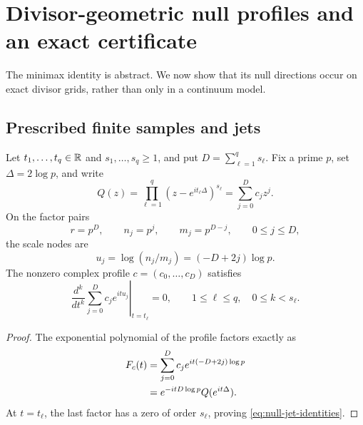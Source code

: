 \section{Divisor-geometric null profiles and an exact certificate}
\label{sec:geometric-certificates}

The minimax identity is abstract.  We now show that its null directions
occur on exact divisor grids, rather than only in a continuum model.

\subsection{Prescribed finite samples and jets}

\begin{theorem}
\label{thm:geometric-null-profile}
Let $t_1,\ldots,t_q\in\mathbb R$ and $s_1,\ldots,s_q\geq1$, and put
\(
 D=\sum_{\ell=1}^q s_\ell
\).
Fix a prime $p$, set $\Delta=2\log p$, and write
\begin{equation}\label{eq:null-polynomial}
 Q(z)=\prod_{\ell=1}^q
 (z-e^{it_\ell\Delta})^{s_\ell}
 =\sum_{j=0}^Dc_jz^j.
\end{equation}
On the factor pairs
\begin{equation}\label{eq:prime-power-factor-pairs}
 r=p^D,\qquad n_j=p^j,\qquad m_j=p^{D-j},\qquad0\leq j\leq D,
\end{equation}
the scale nodes are
\begin{equation}\label{eq:prime-power-scale-nodes}
 u_j=\log(n_j/m_j)=(-D+2j)\log p.
\end{equation}
The nonzero complex profile $c=(c_0,\ldots,c_D)$ satisfies
\begin{equation}\label{eq:null-jet-identities}
 \left.\frac{d^k}{dt^k}\sum_{j=0}^Dc_je^{itu_j}
 \right|_{t=t_\ell}=0,
 \qquad 1\leq\ell\leq q,\quad0\leq k<s_\ell.
\end{equation}
\end{theorem}

\begin{proof}
The exponential polynomial of the profile factors exactly as
\begin{align}
 F_c(t)
 &=\sum_{j=0}^Dc_je^{it(-D+2j)\log p}
 \notag\\
 &=e^{-itD\log p}Q(e^{it\Delta}).
 \label{eq:null-profile-factorization}
\end{align}
At $t=t_\ell$, the last factor has a zero of order $s_\ell$, proving
\eqref{eq:null-jet-identities}.
\end{proof}

